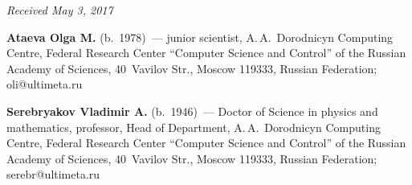 \vspace*{-6pt}

\hfill{\small\textit{Received May 3, 2017}}


\Contr

\noindent
\textbf{Ataeva Olga M.} (b.\ 1978)~--- junior scientist, A.\,A.~Dorodnicyn 
Computing Centre, Federal Research Center 
``Computer Science and Control'' of the Russian Academy of Sciences, 
40~Vavilov Str., Moscow 119333, Russian Federation; \mbox{oli@ultimeta.ru}

\vspace*{3pt}


\noindent
\textbf{Serebryakov Vladimir A.} (b.\ 1946)~--- Doctor of Science in physics 
and mathematics, professor, Head of Department, A.\,A.~Dorodnicyn Computing 
Centre, Federal Research Center ``Computer Science and Control'' of the Russian 
Academy of Sciences, 40~Vavilov Str., Moscow 119333, Russian Federation; 
\mbox{serebr@ultimeta.ru}


\label{end\stat}


\renewcommand{\bibname}{\protect\rm Литература} 